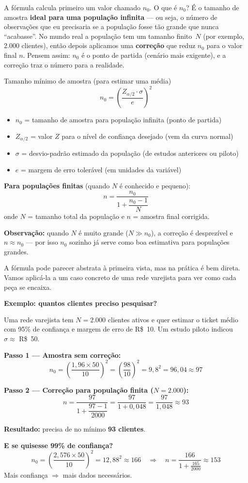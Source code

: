 A fórmula calcula primeiro um valor chamado $n_0$.
O que é $n_0$? É o tamanho de amostra \textbf{ideal para uma população
infinita} --- ou seja, o número de observações que eu precisaria se a
população fosse tão grande que nunca ``acabasse''.
No mundo real a população tem um tamanho finito~$N$ (por exemplo,
2.000 clientes), então depois aplicamos uma \textbf{correção} que
reduz $n_0$ para o valor final $n$.
Pensem assim: $n_0$ é o ponto de partida (cenário mais exigente),
e a correção traz o número para a realidade.

\begin{FormulaBox}{Tamanho mínimo de amostra (para estimar uma média)}
\[
n_0 = \left(\frac{Z_{\alpha/2} \cdot \sigma}{e}\right)^2
\]
\begin{itemize}
  \item $n_0$ = tamanho de amostra para população infinita (ponto de partida)
  \item $Z_{\alpha/2}$ = valor $Z$ para o nível de confiança desejado (vem da curva normal)
  \item $\sigma$ = desvio-padrão estimado da população (de estudos anteriores ou piloto)
  \item $e$ = margem de erro tolerável (em unidades da variável)
\end{itemize}

\textbf{Para populações finitas} (quando $N$ é conhecido e pequeno):
\[
n = \frac{n_0}{1 + \dfrac{n_0 - 1}{N}}
\]
onde $N$ = tamanho total da população e $n$ = amostra final corrigida.

\textbf{Observação:} quando $N$ é muito grande ($N \gg n_0$), a correção
é desprezível e $n \approx n_0$ --- por isso $n_0$ sozinho já serve como
boa estimativa para populações grandes.
\end{FormulaBox}

A fórmula pode parecer abstrata à primeira vista, mas na prática é
bem direta.
Vamos aplicá-la a um caso concreto de uma rede varejista para ver
como cada peça se encaixa.

\begin{SolvedBox}
\textbf{Exemplo: quantos clientes preciso pesquisar?}

Uma rede varejista tem $N = 2.000$ clientes ativos e quer estimar o
ticket médio com 95\% de confiança e margem de erro de R\$~10.
Um estudo piloto indicou $\sigma \approx$ R\$~50.

\textbf{Passo 1 — Amostra sem correção:}
\[
n_0 = \left(\frac{1{,}96 \times 50}{10}\right)^2
    = \left(\frac{98}{10}\right)^2
    = 9{,}8^2
    = 96{,}04
    \approx 97
\]

\textbf{Passo 2 — Correção para população finita ($N = 2.000$):}
\[
n = \frac{97}{1 + \dfrac{97 - 1}{2000}}
  = \frac{97}{1 + 0{,}048}
  = \frac{97}{1{,}048}
  \approx 93
\]

\textbf{Resultado:} precisa de no mínimo \textbf{93 clientes}.

\textbf{E se quisesse 99\% de confiança?}
\[
n_0 = \left(\frac{2{,}576 \times 50}{10}\right)^2
    = 12{,}88^2
    \approx 166
\quad\Rightarrow\quad
n = \frac{166}{1 + \frac{165}{2000}} \approx 153
\]
Mais confiança $\Rightarrow$ mais dados necessários.
\end{SolvedBox}

